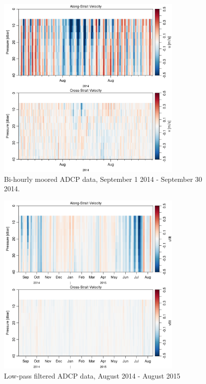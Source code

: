 \documentclass[12pt]{dforeport}
\begin{document}
\begin{figure}  
\centering
\includegraphics[width = 0.8\textwidth]{./figures/15_madcp_2014.png}
\caption[Bi-hourly ADCP data, Sept. 1 - Sept 20, 2014]{Bi-hourly moored ADCP data, September 1 2014 - September 30 2014.}
\label{f:madcp_sept2014}
\end{figure}

\begin{figure}  
\centering
\includegraphics[width = 0.8\textwidth]{./figures/17_madcp_lpf_2014_2015.png}
\caption[Low-pass filtered ADCP data, 2014-2015]{Low-pass filtered ADCP data, August 2014 - August 2015}
\label{f:madcp_lpf_2014_2015}
\end{figure}
\end{document}
